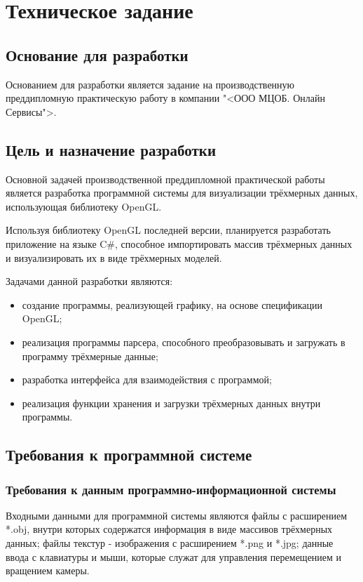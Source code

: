 \section{Техническое задание}
\subsection{Основание для разработки}

Основанием для разработки является задание на производственную преддипломную практическую работу в компании "<ООО МЦОБ. Онлайн Сервисы">.

\subsection{Цель и назначение разработки}

Основной задачей производственной преддипломной практической работы является разработка программной системы для визуализации трёхмерных данных, использующая библиотеку OpenGL.

Используя библиотеку OpenGL последней версии, планируется разработать приложение на языке C\#, способное импортировать массив трёхмерных данных и визуализировать их в виде трёхмерных моделей.

Задачами данной разработки являются:
\begin{itemize}
\item создание программы, реализующей графику, на основе спецификации OpenGL;
\item реализация программы парсера, способного преобразовывать и загружать в программу трёхмерные данные;
\item разработка интерфейса для взаимодействия с программой;
\item реализация функции хранения и загрузки трёхмерных данных внутри программы.
\end{itemize}

\subsection{Требования к программной системе}

\subsubsection{Требования к данным программно-информационной системы}

Входными данными для программной системы являются файлы с расширением *.obj, внутри которых содержатся информация в виде массивов трёхмерных данных; файлы текстур - изображения с расширением *.png и *.jpg; данные ввода с клавиатуры и мыши, которые служат для управления перемещением и вращением камеры.


